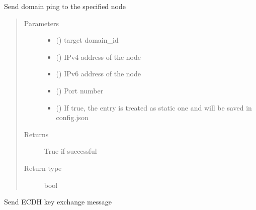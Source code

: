 \documentclass[letterpaper,10pt,english]{sphinxmanual}
\begin{document}
\begin{fulllineitems}
\begin{fulllineitems}
\label{\detokenize{bbc1.core.bbc_network:bbc1.core.bbc_network.BBcNetwork.send_domain_ping}}
Send domain ping to the specified node
\begin{quote}\begin{description}
\item[{Parameters}] \leavevmode\begin{itemize}
\item {} 
 () \textendash{} target domain\_id

\item {} 
 () \textendash{} IPv4 address of the node

\item {} 
 () \textendash{} IPv6 address of the node

\item {} 
 () \textendash{} Port number

\item {} 
 () \textendash{} If true, the entry is treated as static one and will be saved in config.json

\end{itemize}

\item[{Returns}] \leavevmode
True if successful

\item[{Return type}] \leavevmode
bool

\end{description}\end{quote}

\end{fulllineitems}


\begin{fulllineitems}
\label{\detokenize{bbc1.core.bbc_network:bbc1.core.bbc_network.BBcNetwork.send_key_exchange_message}}
Send ECDH key exchange message


\end{fulllineitems}
\end{fulllineitems}
\end{document}
